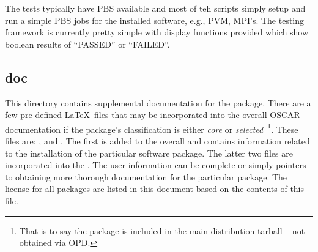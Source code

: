 The tests typically have PBS available and most of teh 
scripts simply setup and run a simple PBS jobs for the installed software,
e.g., PVM, MPI's.  The testing framework is currently pretty simple with
display functions provided which show boolean results of ``PASSED'' or
``FAILED''.




 
\subsection{doc}
\label{sect:pkg-doc}

This directory contains supplemental documentation for the package.  There
are a few pre-defined \LaTeX\ files that may be incorporated into the
overall OSCAR documentation if the package's classification is either
\emph{core} or \emph{selected}~\footnote{That is to say the package is
included in the main distribution tarball -- not obtained via OPD.}.  These
files are: ,  and .  The
first is added to the overall  and contains information
related to the installation of the particular software package.  The latter
two files are incorporated into the .   The user information
can be complete or simply pointers to obtaining more thorough documentation
for the particular package.  The license for all packages are listed in
this document based on the contents of this  file.


